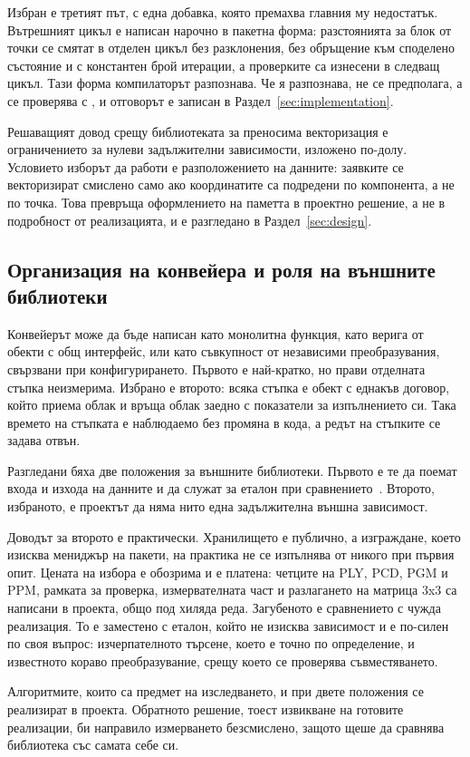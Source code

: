 Избран е третият път, с една добавка, която премахва главния му недостатък. Вътрешният
цикъл е написан нарочно в пакетна форма: разстоянията за блок от точки се смятат в
отделен цикъл без разклонения, без обръщение към споделено състояние и с константен брой
итерации, а проверките са изнесени в следващ цикъл. Тази форма компилаторът разпознава.
Че я разпознава, не се предполага, а се проверява с , и отговорът е
записан в Раздел~\ref{sec:implementation}.

Решаващият довод срещу библиотеката за преносима векторизация е ограничението за нулеви
задължителни зависимости, изложено по-долу. Условието изборът да работи е разположението
на данните: заявките се векторизират смислено само ако координатите са подредени по
компонента, а не по точка. Това превръща оформлението на паметта в проектно решение, а не
в подробност от реализацията, и е разгледано в Раздел~\ref{sec:design}.

\subsection{Организация на конвейера и роля на външните библиотеки}

Конвейерът може да бъде написан като монолитна функция, като верига от обекти с общ
интерфейс, или като съвкупност от независими преобразувания, свързвани при
конфигурирането. Първото е най-кратко, но прави отделната стъпка неизмерима.
Избрано е второто: всяка стъпка е обект с еднакъв договор, който приема облак и връща
облак заедно с показатели за изпълнението си. Така времето на стъпката е наблюдаемо
без промяна в кода, а редът на стъпките се задава отвън.

Разгледани бяха две положения за външните библиотеки. Първото е те да поемат входа и
изхода на данните и да служат за еталон при
сравнението~\cite{rusu2011pcl,bradski2000opencv}. Второто, избраното, е проектът да няма
нито една задължителна външна зависимост.

Доводът за второто е практически. Хранилището е публично, а изграждане, което изисква
мениджър на пакети, на практика не се изпълнява от никого при първия опит. Цената на
избора е обозрима и е платена: четците на PLY, PCD, PGM и PPM, рамката за проверка,
измервателната част и разлагането на матрица 3x3 са написани в проекта, общо под хиляда
реда. Загубеното е сравнението с чужда реализация. То е заместено с еталон, който не
изисква зависимост и е по-силен по своя въпрос: изчерпателното търсене, което е точно по
определение, и известното кораво преобразувание, срещу което се проверява съвместяването.

Алгоритмите, които са предмет на изследването, и при двете положения се реализират в
проекта. Обратното решение, тоест извикване на готовите реализации, би направило
измерването безсмислено, защото щеше да сравнява библиотека със самата себе си.
